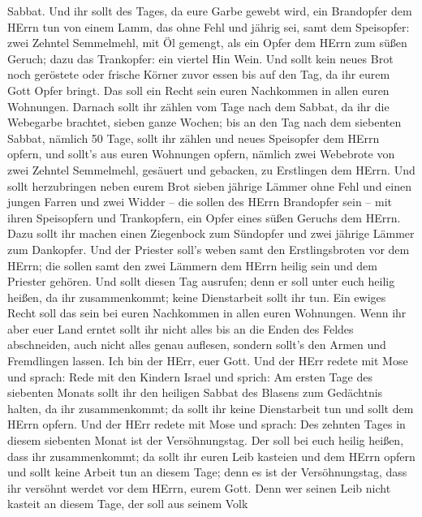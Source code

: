 Sabbat.  Und ihr sollt des Tages, da eure Garbe gewebt
wird, ein Brandopfer dem HErrn tun von einem Lamm, das ohne Fehl und
jährig sei,  samt dem Speisopfer: zwei Zehntel Semmelmehl,
mit Öl gemengt, als ein Opfer dem HErrn zum süßen Geruch; dazu das
Trankopfer: ein viertel Hin Wein.  Und sollt kein neues
Brot noch geröstete oder frische Körner zuvor essen bis auf den Tag, da
ihr eurem Gott Opfer bringt. Das soll ein Recht sein euren Nachkommen in
allen euren Wohnungen.  Darnach sollt ihr zählen vom Tage
nach dem Sabbat, da ihr die Webegarbe brachtet, sieben ganze Wochen;
 bis an den Tag nach dem siebenten Sabbat, nämlich 50 Tage,
sollt ihr zählen und neues Speisopfer dem HErrn opfern, 
und sollt's aus euren Wohnungen opfern, nämlich zwei Webebrote von zwei
Zehntel Semmelmehl, gesäuert und gebacken, zu Erstlingen dem HErrn.
 Und sollt herzubringen neben eurem Brot sieben jährige
Lämmer ohne Fehl und einen jungen Farren und zwei Widder -- die sollen
des HErrn Brandopfer sein -- mit ihren Speisopfern und Trankopfern, ein
Opfer eines süßen Geruchs dem HErrn.  Dazu sollt ihr machen
einen Ziegenbock zum Sündopfer und zwei jährige Lämmer zum Dankopfer.
 Und der Priester soll's weben samt den Erstlingsbroten vor
dem HErrn; die sollen samt den zwei Lämmern dem HErrn heilig sein und
dem Priester gehören.  Und sollt diesen Tag ausrufen; denn
er soll unter euch heilig heißen, da ihr zusammenkommt; keine
Dienstarbeit sollt ihr tun. Ein ewiges Recht soll das sein bei euren
Nachkommen in allen euren Wohnungen.  Wenn ihr aber euer
Land erntet sollt ihr nicht alles bis an die Enden des Feldes
abschneiden, auch nicht alles genau auflesen, sondern sollt's den Armen
und Fremdlingen lassen. Ich bin der HErr, euer Gott.  Und
der HErr redete mit Mose und sprach:  Rede mit den Kindern
Israel und sprich: Am ersten Tage des siebenten Monats sollt ihr den
heiligen Sabbat des Blasens zum Gedächtnis halten, da ihr zusammenkommt;
 da sollt ihr keine Dienstarbeit tun und sollt dem HErrn
opfern.  Und der HErr redete mit Mose und sprach:
 Des zehnten Tages in diesem siebenten Monat ist der
Versöhnungstag. Der soll bei euch heilig heißen, dass ihr zusammenkommt;
da sollt ihr euren Leib kasteien und dem HErrn opfern  und
sollt keine Arbeit tun an diesem Tage; denn es ist der Versöhnungstag,
dass ihr versöhnt werdet vor dem HErrn, eurem Gott.  Denn
wer seinen Leib nicht kasteit an diesem Tage, der soll aus seinem Volk
